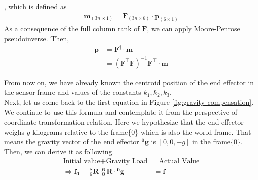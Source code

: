 , which is defined as 
\begin{equation}
\begin{split}
\boldsymbol{m}_{\left(3n \times 1\right)} = \mathbf{F}_{\left(3n \times 6\right)} \cdot \boldsymbol{p}_{\left(6 \times 1\right)}
\end{split}
\end{equation}
As a consequence of the full column rank of $\mathbf{F}$, we can apply Moore-Penrose pseudoinverse. Then, 
\begin{equation*}
\begin{split}
\boldsymbol{p} 	&= \mathbf{F}^{\dagger} \cdot \boldsymbol{m}\\
				&= \left( \mathbf{F}^\top\mathbf{F}\right) ^{-1}\mathbf{F}^\top \cdot \boldsymbol{m}
\end{split}
\end{equation*}

From now on, we have already known the centroid position of the end effector in the sensor frame and values of the constants $k_1,k_2,k_3$.\\
Next, let us come back to the first equation in Figure \ref{fig:gravity compensation}. We continue to use this formula and contemplate it from the perspective of coordinate transformation relation. Here we hypothesize that the end effector weighs $g$ kilograms relative to the frame\{0\} which is also the world frame. That means the gravity vector of the end effector $\boldsymbol{^0\!g}$ is $[0,0,-g]$ in the frame\{0\}. Then, we can derive it as following.
\begin{equation}
\begin{split}
\text{Initial value}	+ \text{Gravity Load} 		&= \text{Actual Value} \\
\Rightarrow
\boldsymbol{f_0} +\  ^\mathrm{S}_6\mathbf{R} \cdot ^6_0\!\mathbf{R} \cdot \boldsymbol{^0\!g} &= \boldsymbol{f}
\end{split}
\end{equation}

